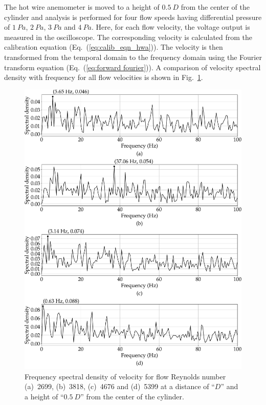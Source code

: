 The hot wire anemometer is moved to a height of $0.5~D$ from the center of the cylinder and analysis is performed for four flow speeds having differential pressure of $1~Pa$, $2~Pa$, $3~Pa$ and $4~Pa$. Here, for each flow velocity, the voltage output is measured in the oscilloscope. The corresponding velocity is calculated from the calibration equation (Eq.~(\ref{eq:calib_eqn_hwa})). The velocity is then transformed from the temporal domain to the frequency domain using the Fourier transform equation (Eq.~(\ref{eq:forward fourier})). A comparison of velocity spectral density with frequency for all flow velocities is shown in Fig.~\ref{fig:surface_x_D_y_0-5_D}.
\begin{figure}
    \centering
    \includegraphics[width=\linewidth]{gfx/FFT_all_freq_x_D_y_0-5_D.pdf}
    \caption{Frequency spectral density of velocity for flow Reynolds number (a)~2699, (b)~3818, (c)~4676 and (d)~5399 at a distance of \enquote{$D$} and a height of \enquote{$0.5~D$} from the center of the cylinder.}
    \label{fig:surface_x_D_y_0-5_D}
\end{figure}
